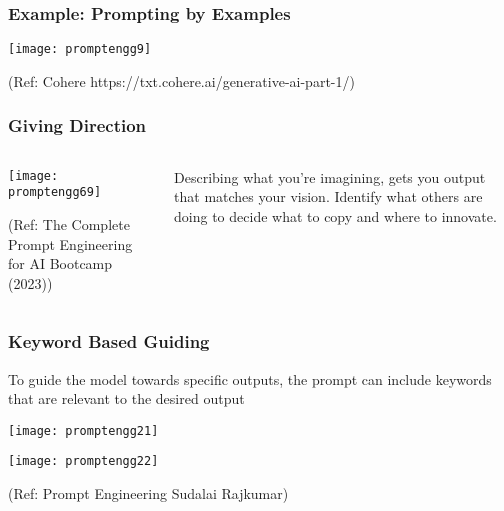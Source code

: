 \begin{frame}[fragile]\frametitle{Example: Prompting by Examples}

\begin{center}
\texttt{[image: promptengg9]}

{\tiny (Ref: Cohere https://txt.cohere.ai/generative-ai-part-1/)}

\end{center}		
		
\end{frame}

\begin{frame}[fragile]\frametitle{Giving Direction}

\begin{columns}
    \begin{column}[T]{0.6\linewidth}
		\begin{center}
		\texttt{[image: promptengg69]}

		{\tiny (Ref: The Complete Prompt Engineering for AI Bootcamp (2023))}
		\end{center}	
    \end{column}
    \begin{column}[T]{0.4\linewidth}
		Describing what you’re imagining, gets you output that matches your vision.
		Identify what others are doing to decide what to copy and where to innovate.
    \end{column}
  \end{columns}
\end{frame}

\begin{frame}[fragile]\frametitle{ Keyword Based Guiding}

To guide the model towards specific outputs, the prompt can include 
keywords that are relevant to the desired output

\begin{center}
\texttt{[image: promptengg21]}

\texttt{[image: promptengg22]}

{\tiny (Ref: Prompt Engineering Sudalai Rajkumar)}

\end{center}		
	
\end{frame}

